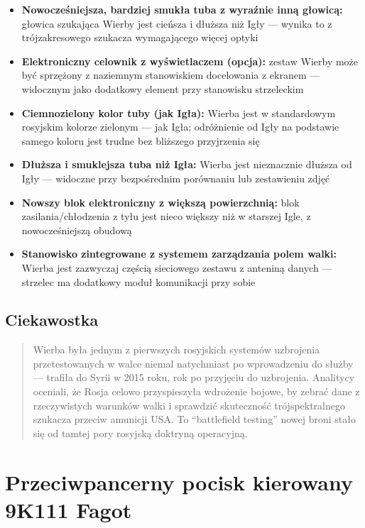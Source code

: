\documentclass[12pt,openany,oneside]{book}
\providecommand{\tightlist}{%
  \setlength{\itemsep}{0pt}\setlength{\parskip}{0pt}}
\begin{document}
\begin{itemize}
\tightlist
\item
  \textbf{Nowocześniejsza, bardziej smukła tuba z wyraźnie inną
  głowicą:} głowica szukająca Wierby jest cieńsza i dłuższa niż Igły ---
  wynika to z trójzakresowego szukacza wymagającego więcej optyki
\item
  \textbf{Elektroniczny celownik z wyświetlaczem (opcja):} zestaw Wierby
  może być sprzężony z naziemnym stanowiskiem docelowania z ekranem ---
  widocznym jako dodatkowy element przy stanowisku strzeleckim
\item
  \textbf{Ciemnozielony kolor tuby (jak Igła):} Wierba jest w
  standardowym rosyjskim kolorze zielonym --- jak Igła; odróżnienie od
  Igły na podstawie samego koloru jest trudne bez bliższego przyjrzenia
  się
\item
  \textbf{Dłuższa i smuklejsza tuba niż Igła:} Wierba jest nieznacznie
  dłuższa od Igły --- widoczne przy bezpośrednim porównaniu lub
  zestawieniu zdjęć
\item
  \textbf{Nowszy blok elektroniczny z większą powierzchnią:} blok
  zasilania/chłodzenia z tyłu jest nieco większy niż w starszej Igle, z
  nowocześniejszą obudową
\item
  \textbf{Stanowisko zintegrowane z systemem zarządzania polem walki:}
  Wierba jest zazwyczaj częścią sieciowego zestawu z anteniną danych ---
  strzelec ma dodatkowy moduł komunikacji przy sobie
\end{itemize}

\section{Ciekawostka}\label{ciekawostka-33}

\begin{quote}
Wierba była jednym z pierwszych rosyjskich systemów uzbrojenia
przetestowanych w walce niemal natychmiast po wprowadzeniu do służby ---
trafiła do Syrii w 2015 roku, rok po przyjęciu do uzbrojenia. Analitycy
oceniali, że Rosja celowo przyspieszyła wdrożenie bojowe, by zebrać dane
z rzeczywistych warunków walki i sprawdzić skuteczność trójspektralnego
szukacza przeciw amunicji USA. To ``battlefield testing'' nowej broni
stało się od tamtej pory rosyjską doktryną operacyjną.
\end{quote}

\chapter{Przeciwpancerny pocisk kierowany 9K111
Fagot}\label{przeciwpancerny-pocisk-kierowany-9k111-fagot}
\end{document}

